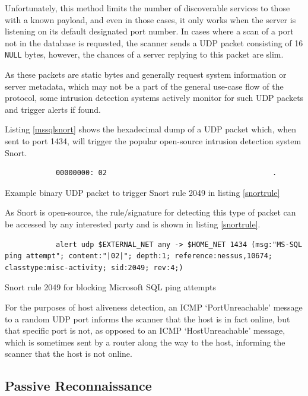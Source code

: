\documentclass[a4paper,12pt]{article}
\begin{document}
	Unfortunately, this method limits the number of discoverable services to those with a known payload, and even in those cases, it only works when the server is listening on its default designated port number. In cases where a scan of a port not in the database is requested, the scanner sends a UDP packet consisting of 16 \texttt{NULL} bytes, however, the chances of a server replying to this packet are slim.
	
	As these packets are static bytes and generally request system information or server metadata, which may not be a part of the general use-case flow of the protocol, some intrusion detection systems actively monitor for such UDP packets and trigger alerts if found.
	
	Listing \ref{mssqlsnort} shows the hexadecimal dump of a UDP packet which, when sent to port 1434, will trigger the popular open-source intrusion detection system Snort\cite{snort49}.
	
	\begin{listing}[H]
		\begin{verbatim}
			00000000: 02                                       .
		\end{verbatim}
		\caption{Example binary UDP packet to trigger Snort rule 2049 in listing \ref{snortrule}}
		\label{mssqlsnort}
	\end{listing}
	
	As Snort is open-source, the rule/signature for detecting this type of packet can be accessed by any interested party and is shown in listing \ref{snortrule}.
	
	\begin{listing}[H]
		\begin{verbatim}
			alert udp $EXTERNAL_NET any -> $HOME_NET 1434 (msg:"MS-SQL ping attempt"; content:"|02|"; depth:1; reference:nessus,10674; classtype:misc-activity; sid:2049; rev:4;)
		\end{verbatim}
		\caption{Snort rule 2049 for blocking Microsoft SQL ping attempts\cite{snort49}}
		\label{snortrule}
	\end{listing}
	
	For the purposes of host aliveness detection, an ICMP `PortUnreachable' message to a random UDP port informs the scanner that the host is in fact online, but that specific port is not, as opposed to an ICMP `HostUnreachable' message, which is sometimes sent by a router along the way to the host, informing the scanner that the host is not online.

\subsection{Passive Reconnaissance}
 
\end{document}
